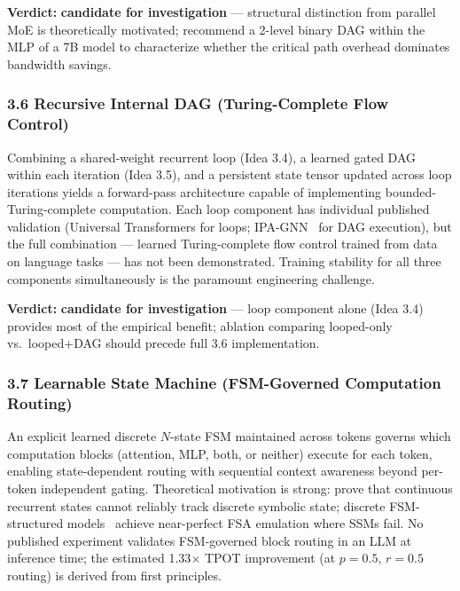 \documentclass[11pt]{article}
\begin{document}
\textbf{Verdict:} \textbf{candidate for investigation} --- structural distinction from parallel MoE is theoretically motivated; recommend a 2-level binary DAG within the MLP of a 7B model to characterize whether the critical path overhead dominates bandwidth savings.

\subsubsection{3.6 Recursive Internal DAG (Turing-Complete Flow Control)}
\label{sec:idea_3_6}

Combining a shared-weight recurrent loop (Idea 3.4), a learned gated DAG within each iteration (Idea 3.5), and a persistent state tensor updated across loop iterations yields a forward-pass architecture capable of implementing bounded-Turing-complete computation.
Each loop component has individual published validation (Universal Transformers for loops; IPA-GNN~\cite{Bieber2020IPAGNN} for DAG execution), but the full combination --- learned Turing-complete flow control trained from data on language tasks --- has not been demonstrated.
Training stability for all three components simultaneously is the paramount engineering challenge.

\textbf{Verdict:} \textbf{candidate for investigation} --- loop component alone (Idea 3.4) provides most of the empirical benefit; ablation comparing looped-only vs.\ looped+DAG should precede full 3.6 implementation.

\subsubsection{3.7 Learnable State Machine (FSM-Governed Computation Routing)}
\label{sec:idea_3_7}

An explicit learned discrete $N$-state FSM maintained across tokens governs which computation blocks (attention, MLP, both, or neither) execute for each token, enabling state-dependent routing with sequential context awareness beyond per-token independent gating.
Theoretical motivation is strong: \cite{Merrill2024Expressiveness} prove that continuous recurrent states cannot reliably track discrete symbolic state; discrete FSM-structured models~\cite{Terzic2025PDSSM,Terzic2025SDSSM} achieve near-perfect FSA emulation where SSMs fail.
No published experiment validates FSM-governed block routing in an LLM at inference time; the estimated 1.33$\times$ TPOT improvement (at $p = 0.5$, $r = 0.5$ routing) is derived from first principles.
\end{document}
